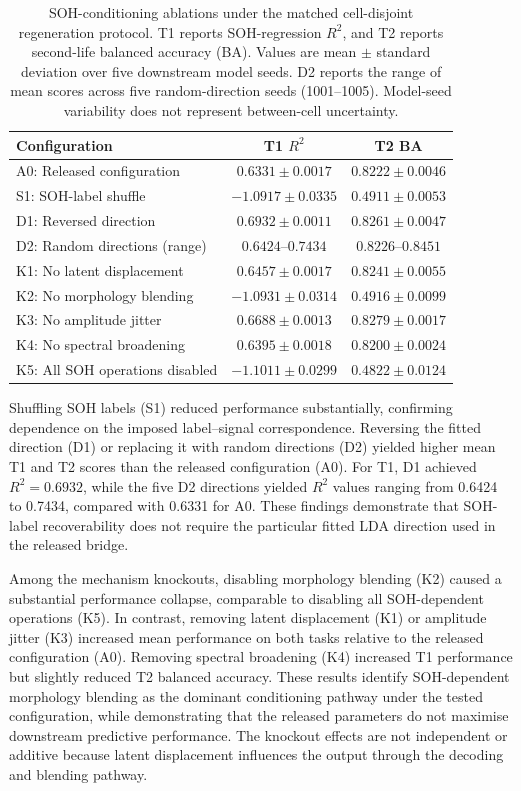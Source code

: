 \documentclass[11pt]{article}
\begin{document}
\begin{table}[!htbp]
\centering
\caption{SOH-conditioning ablations under the matched
cell-disjoint regeneration protocol. T1 reports
SOH-regression $R^2$, and T2 reports second-life
balanced accuracy (BA). Values are mean $\pm$
standard deviation over five downstream model
seeds. D2 reports the range of mean scores across
five random-direction seeds (1001--1005).
Model-seed variability does not represent
between-cell uncertainty.}
\label{tab:soh_knockout}
\footnotesize
\begin{tabular}{@{}lcc@{}}
\toprule
Configuration & T1 $R^2$ & T2 BA \\
\midrule
A0: Released configuration
 & $0.6331 \pm 0.0017$ & $0.8222 \pm 0.0046$ \\
S1: SOH-label shuffle
 & $-1.0917 \pm 0.0335$ & $0.4911 \pm 0.0053$ \\
D1: Reversed direction
 & $0.6932 \pm 0.0011$ & $0.8261 \pm 0.0047$ \\
D2: Random directions (range)
 & $0.6424$--$0.7434$ & $0.8226$--$0.8451$ \\
K1: No latent displacement
 & $0.6457 \pm 0.0017$ & $0.8241 \pm 0.0055$ \\
K2: No morphology blending
 & $-1.0931 \pm 0.0314$ & $0.4916 \pm 0.0099$ \\
K3: No amplitude jitter
 & $0.6688 \pm 0.0013$ & $0.8279 \pm 0.0017$ \\
K4: No spectral broadening
 & $0.6395 \pm 0.0018$ & $0.8200 \pm 0.0024$ \\
K5: All SOH operations disabled
 & $-1.1011 \pm 0.0299$ & $0.4822 \pm 0.0124$ \\
\bottomrule
\end{tabular}
\end{table}

Shuffling SOH labels (S1) reduced performance
substantially, confirming dependence on the imposed
label--signal correspondence. Reversing the fitted
direction (D1) or replacing it with random directions
(D2) yielded higher mean T1 and T2 scores than the
released configuration (A0). For T1, D1 achieved
$R^2=0.6932$, while the five D2 directions yielded
$R^2$ values ranging from 0.6424 to 0.7434,
compared with 0.6331 for A0. These findings
demonstrate that SOH-label recoverability does not
require the particular fitted LDA direction used
in the released bridge.

Among the mechanism knockouts, disabling morphology
blending (K2) caused a substantial performance
collapse, comparable to disabling all SOH-dependent
operations (K5). In contrast, removing latent
displacement (K1) or amplitude jitter (K3) increased
mean performance on both tasks relative to the
released configuration (A0). Removing spectral
broadening (K4) increased T1 performance but
slightly reduced T2 balanced accuracy. These results
identify SOH-dependent morphology blending as the
dominant conditioning pathway under the tested
configuration, while demonstrating that the released
parameters do not maximise downstream predictive
performance. The knockout effects are not independent
or additive because latent displacement influences
the output through the decoding and blending pathway.
\end{document}

